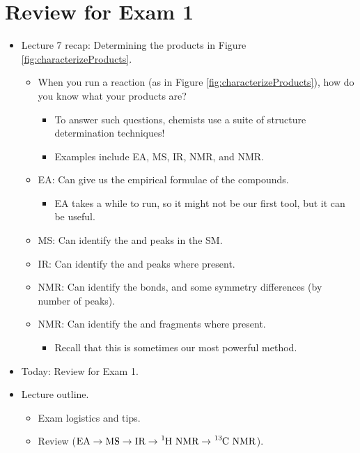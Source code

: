 \documentclass[../notes.tex]{subfiles}
\begin{document}
\section{Review for Exam 1}
\begin{itemize}
    \item {}Lecture 7 recap: Determining the products in Figure \ref{fig:characterizeProducts}.
    \begin{itemize}
        \item When you run a reaction (as in Figure \ref{fig:characterizeProducts}), how do you know what your products are?
        \begin{itemize}
            \item To answer such questions, chemists use a suite of structure determination techniques!
            \item Examples include EA, MS, IR,  NMR, and  NMR.
        \end{itemize}
        \item EA: Can give us the empirical formulae of the compounds.
        \begin{itemize}
            \item EA takes a while to run, so it might not be our first tool, but it can be useful.
        \end{itemize}
        \item MS: Can identify the  and  peaks in the SM.
        \item IR: Can identify the  and  peaks where present.
        \item {} NMR: Can identify the  bonds, and some symmetry differences (by number of peaks).
        \item {} NMR: Can identify the  and  fragments where present.
        \begin{itemize}
            \item Recall that this is sometimes our most powerful method.
        \end{itemize}
    \end{itemize}
    \item Today: Review for Exam 1.
    \item Lecture outline.
    \begin{itemize}
        \item Exam logistics and tips.
        \item Review ($\text{EA}\to\text{MS}\to\text{IR}\to\text{\ce{{}^1H} NMR}\to\text{\ce{{}^13C} NMR}$).

\end{itemize}
\end{itemize}
\end{document}
